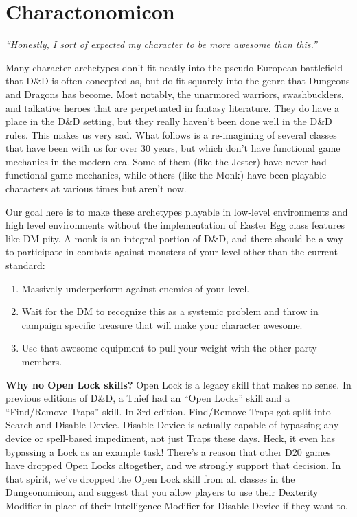 \documentclass[10pt]{report}
\newcommand{\normalsections}{
\sectionfont{\noindent\rule{\textwidth}{0.015in}\\\nohang}
\subsectionfont{\noindent\rule{\textwidth}{0.005in}\\\nohang}
}
\newcommand{\quot}[1]{\emph{#1}\medskip}
\newcommand{\itemspace}{\setlength{\itemsep}{-1mm}\setlength{\topsep}{-1mm} }
\begin{document}


\pagestyle{fancy}
\linespread{.9}  \small  \normalsize \itemspace \normalsections

\tableofcontents



\chapter{Charactonomicon}

\quot{``Honestly, I sort of expected my character to be more awesome than this.''}

Many character archetypes don't fit neatly into the pseudo-European-battlefield that D\&D is often concepted as, but do fit squarely into the genre that Dungeons and Dragons has become. Most notably, the unarmored warriors, swashbucklers, and talkative heroes that are perpetuated in fantasy literature. They do have a place in the D\&D setting, but they really haven't been done well in the D\&D rules. This makes us very sad. What follows is a re-imagining of several classes that have been with us for over 30 years, but which don't have functional game mechanics in the modern era. Some of them (like the Jester) have never had functional game mechanics, while others (like the Monk) have been playable characters at various times but aren't now.

Our goal here is to make these archetypes playable in low-level environments and high level environments without the implementation of Easter Egg class features like DM pity. A monk is an integral portion of D\&D, and there should be a way to participate in combats against monsters of your level other than the current standard:

\begin{enumerate}
\item Massively underperform against enemies of your level.
\item Wait for the DM to recognize this as a systemic problem and throw in campaign specific treasure that will make your character awesome.
\item Use that awesome equipment to pull your weight with the other party members.
\end{enumerate}
\vspace{20pt}

\textbf{Why no Open Lock skills?} Open Lock is a legacy skill that makes no sense. In previous editions of D\&D, a Thief had an ``Open Locks'' skill and a ``Find/Remove Traps'' skill. In 3rd edition. Find/Remove Traps got split into Search and Disable Device. Disable Device is actually capable of bypassing any device or spell-based impediment, not just Traps these days. Heck, it even has bypassing a Lock as an example task! There's a reason that other D20 games have dropped Open Locks altogether, and we strongly support that decision. In that spirit, we've dropped the Open Lock skill from all classes in the Dungeonomicon, and suggest that you allow players to use their Dexterity Modifier in place of their Intelligence Modifier for Disable Device if they want to.
\end{document}

